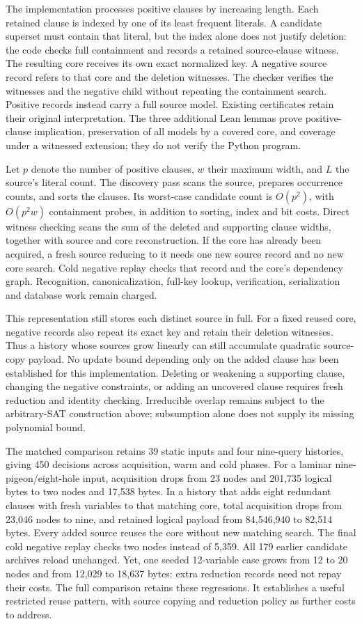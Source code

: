 \documentclass[11pt,a4paper]{article}
\numberwithin{equation}{section}
\theoremstyle{plain}
\theoremstyle{definition}
\theoremstyle{remark}
\begin{document}
The implementation processes positive clauses by increasing length. Each retained clause is indexed by one of its least frequent literals. A candidate superset must contain that literal, but the index alone does not justify deletion: the code checks full containment and records a retained source-clause witness. The resulting core receives its own exact normalized key. A negative source record refers to that core and the deletion witnesses. The checker verifies the witnesses and the negative child without repeating the containment search. Positive records instead carry a full source model. Existing certificates retain their original interpretation. The three additional Lean lemmas prove positive-clause implication, preservation of all models by a covered core, and coverage under a witnessed extension; they do not verify the Python program.

Let $p$ denote the number of positive clauses, $w$ their maximum width, and $L$ the source's literal count. The discovery pass scans the source, prepares occurrence counts, and sorts the clauses. Its worst-case candidate count is $O(p^2)$, with $O(p^2w)$ containment probes, in addition to sorting, index and bit costs. Direct witness checking scans the sum of the deleted and supporting clause widths, together with source and core reconstruction. If the core has already been acquired, a fresh source reducing to it needs one new source record and no new core search. Cold negative replay checks that record and the core's dependency graph. Recognition, canonicalization, full-key lookup, verification, serialization and database work remain charged.

This representation still stores each distinct source in full. For a fixed reused core, negative records also repeat its exact key and retain their deletion witnesses. Thus a history whose sources grow linearly can still accumulate quadratic source-copy payload. No update bound depending only on the added clause has been established for this implementation. Deleting or weakening a supporting clause, changing the negative constraints, or adding an uncovered clause requires fresh reduction and identity checking. Irreducible overlap remains subject to the arbitrary-SAT construction above; subsumption alone does not supply its missing polynomial bound.

The matched comparison retains 39 static inputs and four nine-query histories, giving 450 decisions across acquisition, warm and cold phases. For a laminar nine-pigeon/eight-hole input, acquisition drops from 23 nodes and 201,735 logical bytes to two nodes and 17,538 bytes. In a history that adds eight redundant clauses with fresh variables to that matching core, total acquisition drops from 23,046 nodes to nine, and retained logical payload from 84,546,940 to 82,514 bytes. Every added source reuses the core without new matching search. The final cold negative replay checks two nodes instead of 5,359. All 179 earlier candidate archives reload unchanged. Yet, one seeded 12-variable case grows from 12 to 20 nodes and from 12,029 to 18,637 bytes: extra reduction records need not repay their costs. The full comparison retains these regressions. It establishes a useful restricted reuse pattern, with source copying and reduction policy as further costs to address.
\end{document}
